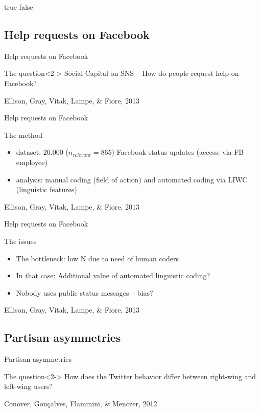 \if true false
\subsection{Help requests on Facebook}
\begin{frame}{Help requests on Facebook}
\begin{block}{The question}<2->
Social Capital on SNS -- How do people request help on Facebook?
\end{block}
\footnotesize{Ellison, Gray, Vitak, Lampe, \& Fiore, 2013}
\end{frame}

\begin{frame}{Help requests on Facebook}
\begin{block}{The method}
\begin{itemize}
\item dataset: 20.000 ($n_{relevant} = 865$) Facebook status updates (access: via FB employee)
\item analysis: manual coding (field of action) and automated coding via LIWC (linguistic features)
\end{itemize}
\end{block}
\footnotesize{Ellison, Gray, Vitak, Lampe, \& Fiore, 2013}
\end{frame}

\begin{frame}{Help requests on Facebook}
\begin{block}{The issues}
\begin{itemize}
\item<2-> The bottleneck: low N due to need of human coders 
\item<3-> In that case: Additional value of automated linguistic coding?
\item<4-> Nobody uses public status messages -- bias?
\end{itemize}
\end{block}
\footnotesize{Ellison, Gray, Vitak, Lampe, \& Fiore, 2013}
\end{frame}
\fi



\subsection{Partisan asymmetries}
\begin{frame}{Partisan asymmetries}
\begin{block}{The question}<2->
How does the Twitter behavior differ between right-wing and left-wing users?
\end{block}
\footnotesize{Conover, Gonçalves, Flammini, \& Menczer, 2012}
\end{frame}

